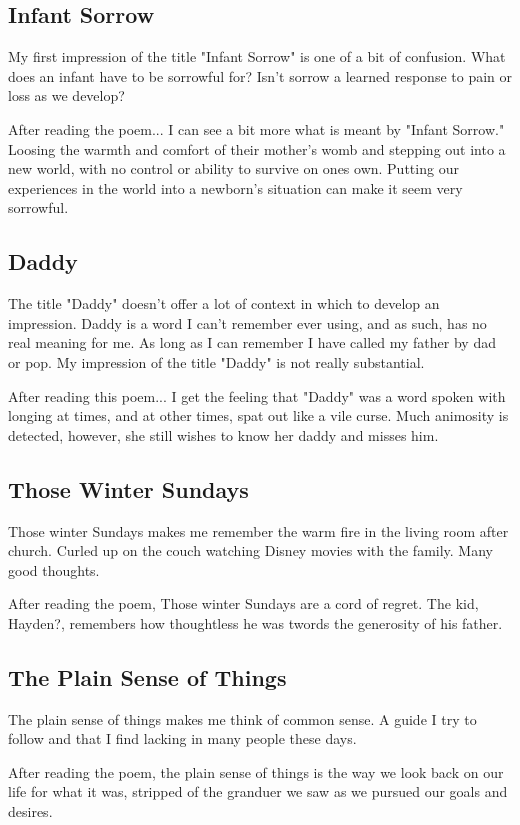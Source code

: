 \documentclass[a4paper,12pt]{article}
\begin{document}
\subsection*{Infant Sorrow}
My first impression of the title "Infant Sorrow" is one of a bit of confusion.  What does an infant have to be sorrowful for?  Isn't sorrow a learned response to pain or loss as we develop?

After reading the poem... I can see a bit more what is meant by "Infant Sorrow."  Loosing the warmth and comfort of their mother's womb and stepping out into a new world, with no control or ability to survive on ones own.  Putting our experiences in the world into a newborn's situation can make it seem very sorrowful.

\subsection*{Daddy}
The title "Daddy" doesn't offer a lot of context in which to develop an impression.  Daddy is a word I can't remember ever using, and as such, has no real meaning for me.  As long as I can remember I have called my father by dad or pop.  My impression of the title "Daddy" is not really substantial.

After reading this poem... I get the feeling that "Daddy" was a word spoken with longing at times, and at other times, spat out like a vile curse.  Much animosity is detected, however, she still wishes to know her daddy and misses him.

\subsection*{Those Winter Sundays}
Those winter Sundays makes me remember the warm fire in the living room after church.  Curled up on the couch watching Disney movies with the family.  Many good thoughts.

After reading the poem, Those winter Sundays are a cord of regret.  The kid, Hayden?, remembers how thoughtless he was twords the generosity of his father.

\subsection*{The Plain Sense of Things}
The plain sense of things makes me think of common sense.  A guide I try to follow and that I find lacking in many people these days.

After reading the poem, the plain sense of things is the way we look back on our life for what it was, stripped of the granduer we saw as we pursued our goals and desires.  
\end{document}
